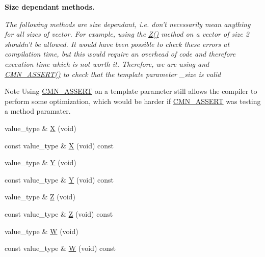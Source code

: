 \begin{Indent}{\bf Size dependant methods.}\par
{\em The following methods are size dependant, i.\-e. don't necessarily mean anything for all sizes of vector. For example, using the \hyperlink{classvct_fixed_size_vector_base_a15c85340aa4eb4a1d5be6c40aa3702fe}{Z()} method on a vector of size 2 shouldn't be allowed. It would have been possible to check these errors at compilation time, but this would require an overhead of code and therefore execution time which is not worth it. Therefore, we are using and \hyperlink{group__cisst_common_ga6a12b7031ea38ac5bf5937b8633c97ff}{C\-M\-N\-\_\-\-A\-S\-S\-E\-R\-T()} to check that the template parameter \-\_\-size is valid

\begin{DoxyNote}{Note}
Using \hyperlink{group__cisst_common_ga6a12b7031ea38ac5bf5937b8633c97ff}{C\-M\-N\-\_\-\-A\-S\-S\-E\-R\-T} on a template parameter still allows the compiler to perform some optimization, which would be harder if \hyperlink{group__cisst_common_ga6a12b7031ea38ac5bf5937b8633c97ff}{C\-M\-N\-\_\-\-A\-S\-S\-E\-R\-T} was testing a method paramater. 
\end{DoxyNote}
}\begin{DoxyCompactItemize}
\item 
value\-\_\-type \& \hyperlink{classvct_fixed_size_vector_base_a0f03468446ec3e6e38c52a1c9253c116}{X} (void)
\item 
const value\-\_\-type \& \hyperlink{classvct_fixed_size_vector_base_a47cb86c954e7b93c4b4c05f8256a2252}{X} (void) const 
\item 
value\-\_\-type \& \hyperlink{classvct_fixed_size_vector_base_af456c20051ca3d523b2350fa6834b465}{Y} (void)
\item 
const value\-\_\-type \& \hyperlink{classvct_fixed_size_vector_base_a8ed11e57bfe5289a8069936dea3cf08c}{Y} (void) const 
\item 
value\-\_\-type \& \hyperlink{classvct_fixed_size_vector_base_a15c85340aa4eb4a1d5be6c40aa3702fe}{Z} (void)
\item 
const value\-\_\-type \& \hyperlink{classvct_fixed_size_vector_base_af90d527c98dcfaf6307afd7b7592b255}{Z} (void) const 
\item 
value\-\_\-type \& \hyperlink{classvct_fixed_size_vector_base_a89aba41dcc523b3614229db3acf507dd}{W} (void)
\item 
const value\-\_\-type \& \hyperlink{classvct_fixed_size_vector_base_a0714b81a2b9ad92ee9dcb8f2baaec0c0}{W} (void) const 

\end{DoxyCompactItemize}
\end{Indent}
